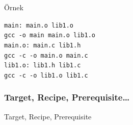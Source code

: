 \documentclass{beamer}
\begin{document}
\begin{frame}
    {Örnek}

    \texttt{main: main.o lib1.o \\
    \hspace{10mm}	gcc -o main main.o lib1.o \\\vspace{3mm}
main.o: main.c lib1.h\\
	\hspace{10mm}	gcc -c -o main.o main.c\\\vspace{3mm}
lib1.o: lib1.h lib1.c\\
    \hspace{10mm}	gcc -c -o lib1.o lib1.c\\}
    
\end{frame}

\subsubsection{Target, Recipe, Prerequisite\ldots}
{
\begin{frame}
{Target, Recipe, Prerequisite}
\end{frame}
}
\end{document}
